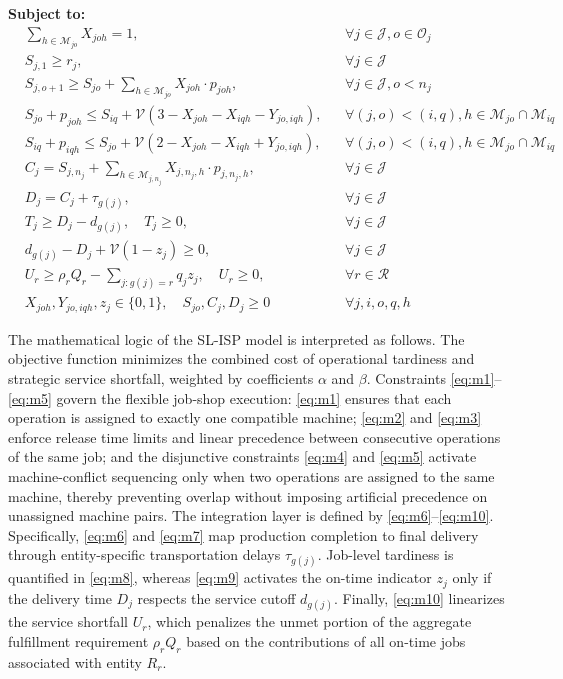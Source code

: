 \documentclass[a4paper,fleqn]{cas-sc}
\begin{document}
\noindent \textbf{Subject to:}
\begin{align}
& \sum_{h \in \mathcal{M}_{jo}} X_{joh} = 1, && \forall j \in \mathcal{J}, o \in \mathcal{O}_j \label{eq:m1} \\
& S_{j, 1} \ge r_j, && \forall j \in \mathcal{J} \label{eq:m2} \\
& S_{j, o+1} \ge S_{jo} + \sum_{h \in \mathcal{M}_{jo}} X_{joh} \cdot p_{joh}, && \forall j \in \mathcal{J}, o < n_j \label{eq:m3} \\
& S_{jo} + p_{joh} \le S_{iq} + \mathcal{V}(3 - X_{joh} - X_{iqh} - Y_{jo, iqh}), && \forall (j,o) < (i,q), h \in \mathcal{M}_{jo} \cap \mathcal{M}_{iq} \label{eq:m4} \\
& S_{iq} + p_{iqh} \le S_{jo} + \mathcal{V}(2 - X_{joh} - X_{iqh} + Y_{jo, iqh}), && \forall (j,o) < (i,q), h \in \mathcal{M}_{jo} \cap \mathcal{M}_{iq} \label{eq:m5} \\
& C_j = S_{j, n_j} + \sum_{h \in \mathcal{M}_{j,n_j}} X_{j,n_j,h} \cdot p_{j,n_j,h}, && \forall j \in \mathcal{J} \label{eq:m6} \\
& D_j = C_j + \tau_{g(j)}, && \forall j \in \mathcal{J} \label{eq:m7} \\
& T_j \ge D_j - d_{g(j)}, \quad T_j \ge 0, && \forall j \in \mathcal{J} \label{eq:m8} \\
& d_{g(j)} - D_j + \mathcal{V}(1 - z_j) \ge 0, && \forall j \in \mathcal{J} \label{eq:m9} \\
& U_r \ge \rho_r Q_r - \sum_{j: g(j)=r} q_j z_j, \quad U_r \ge 0, && \forall r \in \mathcal{R} \label{eq:m10} \\
& X_{joh}, Y_{jo, iqh}, z_j \in \{0, 1\}, \quad S_{jo}, C_j, D_j \ge 0 && \forall j, i, o, q, h \label{eq:m11}
\end{align}

The mathematical logic of the SL-ISP model is interpreted as follows. The objective function minimizes the combined cost of operational tardiness and strategic service shortfall, weighted by coefficients $\alpha$ and $\beta$. Constraints \eqref{eq:m1}--\eqref{eq:m5} govern the flexible job-shop execution: \eqref{eq:m1} ensures that each operation is assigned to exactly one compatible machine; \eqref{eq:m2} and \eqref{eq:m3} enforce release time limits and linear precedence between consecutive operations of the same job; and the disjunctive constraints \eqref{eq:m4} and \eqref{eq:m5} activate machine-conflict sequencing only when two operations are assigned to the same machine, thereby preventing overlap without imposing artificial precedence on unassigned machine pairs. The integration layer is defined by \eqref{eq:m6}--\eqref{eq:m10}. Specifically, \eqref{eq:m6} and \eqref{eq:m7} map production completion to final delivery through entity-specific transportation delays $\tau_{g(j)}$. Job-level tardiness is quantified in \eqref{eq:m8}, whereas \eqref{eq:m9} activates the on-time indicator $z_j$ only if the delivery time $D_j$ respects the service cutoff $d_{g(j)}$. Finally, \eqref{eq:m10} linearizes the service shortfall $U_r$, which penalizes the unmet portion of the aggregate fulfillment requirement $\rho_r Q_r$ based on the contributions of all on-time jobs associated with entity $R_r$.
\end{document}
